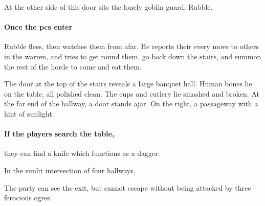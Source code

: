 \begin{multicols}{2}



At the other side of this door sits the lonely goblin guard, Rubble.

\paragraph{Once the \glspl{pc} enter}
Rubble flees, then watches them from afar.
He reports their every move to others in the warren, and tries to get round them, go back down the stairs, and summon the rest of the horde to come and eat them.


\begin{boxtext}

  The door at the top of the stairs reveals a large banquet hall.
  Human bones lie on the table, all polished clean.
  The cups and cutlery lie smashed and broken.
  At the far end of the hallway, a door stands ajar.
  On the right, a passageway with a hint of sunlight.

\end{boxtext}


\paragraph{If the players search the table,}
they can find a knife which functions as a dagger.

\begin{boxtext}

  In the sunlit intersection of four hallways,
  \iftoggle{hardcore}%
    {four ogres sit playing a game of dice.  Two are clad in black leather armour, with a massive sword by their side.
    Another sucks on a horse's uncooked head, while the third goes for a piss behind the staircase.}%
    {three ogres sit playing dice.
    Two are clad in black, leather armour, apparently pieced together from multiple suits.
    The third sits watching them play some dice game.}%

\end{boxtext}


The party can see the exit, but cannot escape without being attacked by three ferocious ogres.


\end{multicols}
